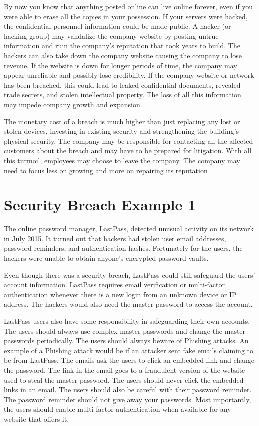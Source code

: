 \documentclass{article}
\begin{document}
By now you know that anything posted online can live online forever, even if you were able to erase all the copies in your possession. If your servers were hacked, the confidential personnel information could be made public. A hacker (or hacking group) may vandalize the company website by posting untrue information and ruin the company’s reputation that took years to build. The hackers can also take down the company website causing the company to lose revenue. If the website is down for longer periods of time, the company may appear unreliable and possibly lose credibility. If the company website or network has been breached, this could lead to leaked confidential documents, revealed trade secrets, and stolen intellectual property. The loss of all this information may impede company growth and expansion.

The monetary cost of a breach is much higher than just replacing any lost or stolen devices, investing in existing security and strengthening the building’s physical security. The company may be responsible for contacting all the affected customers about the breach and may have to be prepared for litigation. With all this turmoil, employees may choose to leave the company. The company may need to focus less on growing and more on repairing its reputation


\section{Security Breach Example 1}

The online password manager, LastPass, detected unusual activity on its network in July 2015. It turned out that hackers had stolen user email addresses, password reminders, and authentication hashes. Fortunately for the users, the hackers were unable to obtain anyone’s encrypted password vaults.

Even though there was a security breach, LastPass could still safeguard the users’ account information. LastPass requires email verification or multi-factor authentication whenever there is a new login from an unknown device or IP address. The hackers would also need the master password to access the account.

LastPass users also have some responsibility in safeguarding their own accounts. The users should always use complex master passwords and change the master passwords periodically. The users should always beware of Phishing attacks. An example of a Phishing attack would be if an attacker sent fake emails claiming to be from LastPass. The emails ask the users to click an embedded link and change the password. The link in the email goes to a fraudulent version of the website used to steal the master password. The users should never click the embedded links in an email. The users should also be careful with their password reminder. The password reminder should not give away your passwords. Most importantly, the users should enable multi-factor authentication when available for any website that offers it.
\end{document}
